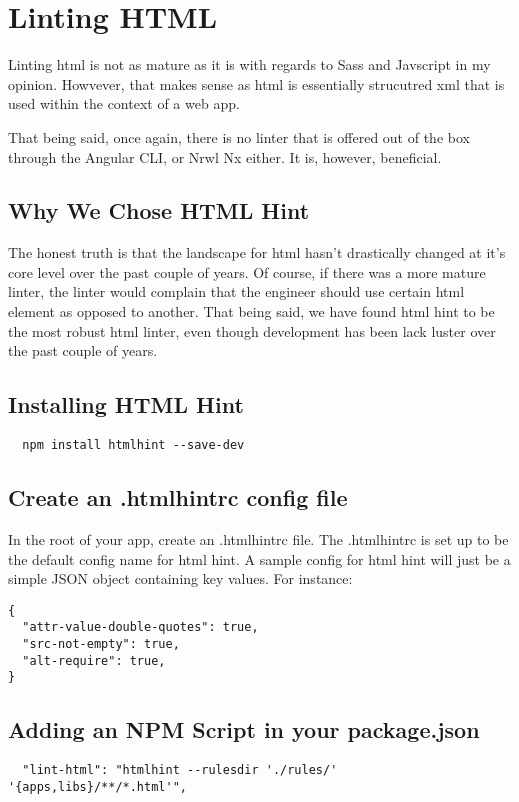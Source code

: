 \maketitle{}
\section{ Linting HTML }

Linting html is not as mature as it is with regards to Sass and Javscript in my
opinion. Howvever, that makes sense as html is essentially strucutred xml that
is used within the context of a web app.

That being said, once again, there is no linter that is offered out of the box
through the Angular CLI, or Nrwl Nx either. It is, however, beneficial.


\subsection{Why We Chose HTML Hint}
The honest truth is that the landscape for html hasn't drastically changed at
it's core level over the past couple of years. Of course, if there was a more
mature linter, the linter would complain that the engineer should use certain
html element as opposed to another. That being said, we have found html hint
to be the most robust html linter, even though development has been lack luster
over the past couple of years.

\subsection{Installing HTML Hint}
\begin{verbatim}
  npm install htmlhint --save-dev
\end{verbatim}

\subsection{Create an .htmlhintrc config file}
In the root of your app, create an .htmlhintrc file. The .htmlhintrc is set up
to be the default config name for html hint. A sample config for html hint will
just be a simple JSON object containing key values. For instance:
\begin{lstlisting}
{
  "attr-value-double-quotes": true,
  "src-not-empty": true,
  "alt-require": true,
}
\end{lstlisting}

\subsection{Adding an NPM Script in your package.json}
\begin{verbatim}
  "lint-html": "htmlhint --rulesdir './rules/' '{apps,libs}/**/*.html'",
\end{verbatim}

